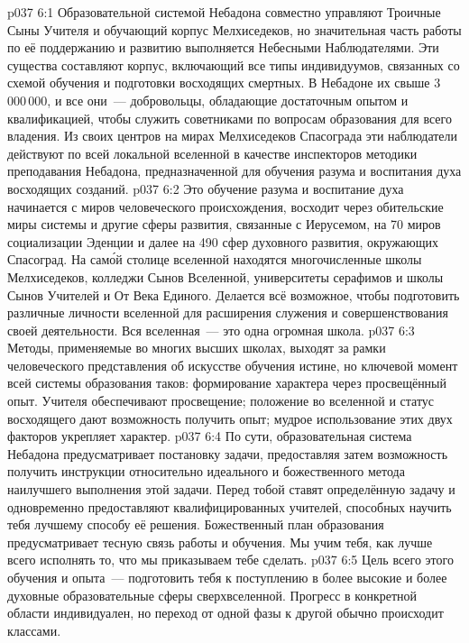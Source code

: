 \vs p037 6:1 Образовательной системой Небадона совместно управляют Троичные Сыны Учителя и обучающий корпус Мелхиседеков, но значительная часть работы по её поддержанию и развитию выполняется Небесными Наблюдателями. Эти существа составляют корпус, включающий все типы индивидуумов, связанных со схемой обучения и подготовки восходящих смертных. В Небадоне их свыше 3\,000\,000, и все они~--- добровольцы, обладающие достаточным опытом и квалификацией, чтобы служить советниками по вопросам образования для всего владения. Из своих центров на мирах Мелхиседеков Спасограда эти наблюдатели действуют по всей локальной вселенной в качестве инспекторов методики преподавания Небадона, предназначенной для обучения разума и воспитания духа восходящих созданий.
\vs p037 6:2 Это обучение разума и воспитание духа начинается с миров человеческого происхождения, восходит через обительские миры системы и другие сферы развития, связанные с Иерусемом, на 70 миров социализации Эденции и далее на 490 сфер духовного развития, окружающих Спасоград. На сам\'ой столице вселенной находятся многочисленные школы Мелхиседеков, колледжи Сынов Вселенной, университеты серафимов и школы Сынов Учителей и От Века Единого. Делается всё возможное, чтобы подготовить различные личности вселенной для расширения служения и совершенствования своей деятельности. Вся вселенная~--- это одна огромная школа.
\vs p037 6:3 \pc Методы, применяемые во многих высших школах, выходят за рамки человеческого представления об искусстве обучения истине, но ключевой момент всей системы образования таков: формирование характера через просвещённый опыт. Учителя обеспечивают просвещение; положение во вселенной и статус восходящего дают возможность получить опыт; мудрое использование этих двух факторов укрепляет характер.
\vs p037 6:4 По сути, образовательная система Небадона предусматривает постановку задачи, предоставляя затем возможность получить инструкции относительно идеального и божественного метода наилучшего выполнения этой задачи. Перед тобой ставят определённую задачу и одновременно предоставляют квалифицированных учителей, способных научить тебя лучшему способу её решения. Божественный план образования предусматривает тесную связь работы и обучения. Мы учим тебя, как лучше всего исполнять то, что мы приказываем тебе сделать.
\vs p037 6:5 Цель всего этого обучения и опыта~--- подготовить тебя к поступлению в более высокие и более духовные образовательные сферы сверхвселенной. Прогресс в конкретной области индивидуален, но переход от одной фазы к другой обычно происходит классами.
